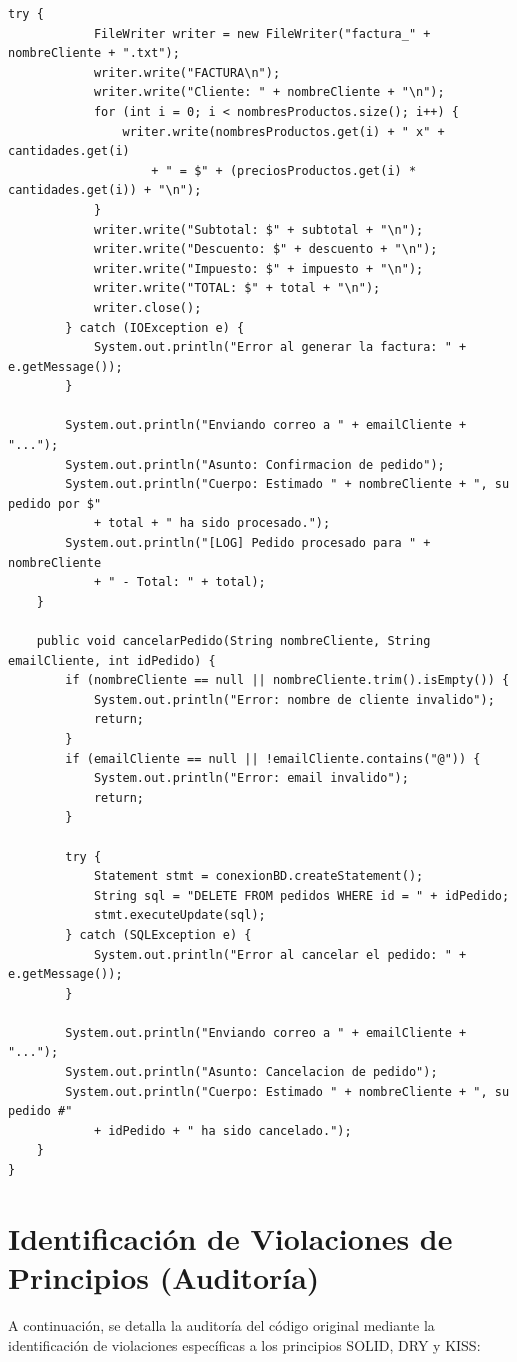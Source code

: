 \documentclass[12pt, a4paper]{article}
\begin{document}
\begin{lstlisting}[caption={Código Java Original}, label={lst:original_code}]
        try {
            FileWriter writer = new FileWriter("factura_" + nombreCliente + ".txt");
            writer.write("FACTURA\n");
            writer.write("Cliente: " + nombreCliente + "\n");
            for (int i = 0; i < nombresProductos.size(); i++) {
                writer.write(nombresProductos.get(i) + " x" + cantidades.get(i)
                    + " = $" + (preciosProductos.get(i) * cantidades.get(i)) + "\n");
            }
            writer.write("Subtotal: $" + subtotal + "\n");
            writer.write("Descuento: $" + descuento + "\n");
            writer.write("Impuesto: $" + impuesto + "\n");
            writer.write("TOTAL: $" + total + "\n");
            writer.close();
        } catch (IOException e) {
            System.out.println("Error al generar la factura: " + e.getMessage());
        }

        System.out.println("Enviando correo a " + emailCliente + "...");
        System.out.println("Asunto: Confirmacion de pedido");
        System.out.println("Cuerpo: Estimado " + nombreCliente + ", su pedido por $"
            + total + " ha sido procesado.");
        System.out.println("[LOG] Pedido procesado para " + nombreCliente
            + " - Total: " + total);
    }

    public void cancelarPedido(String nombreCliente, String emailCliente, int idPedido) {
        if (nombreCliente == null || nombreCliente.trim().isEmpty()) {
            System.out.println("Error: nombre de cliente invalido");
            return;
        }
        if (emailCliente == null || !emailCliente.contains("@")) {
            System.out.println("Error: email invalido");
            return;
        }

        try {
            Statement stmt = conexionBD.createStatement();
            String sql = "DELETE FROM pedidos WHERE id = " + idPedido;
            stmt.executeUpdate(sql);
        } catch (SQLException e) {
            System.out.println("Error al cancelar el pedido: " + e.getMessage());
        }

        System.out.println("Enviando correo a " + emailCliente + "...");
        System.out.println("Asunto: Cancelacion de pedido");
        System.out.println("Cuerpo: Estimado " + nombreCliente + ", su pedido #"
            + idPedido + " ha sido cancelado.");
    }
}
\end{lstlisting}

\newpage
\section{Identificación de Violaciones de Principios (Auditoría)}
A continuación, se detalla la auditoría del código original mediante la identificación de violaciones específicas a los principios SOLID, DRY y KISS:
\end{document}
